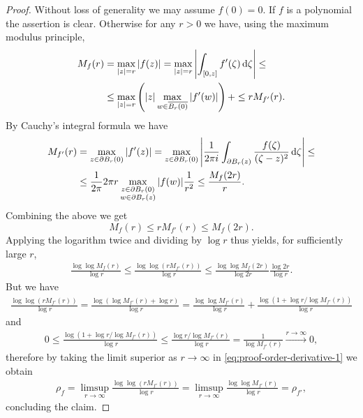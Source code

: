 \begin{proof}
    Without loss of generality we may assume $f(0) = 0$. If $f$ is a polynomial the assertion is clear. Otherwise for any $r > 0$ we have, using the maximum modulus principle,
    \begin{align*}
        M_f(r) &= \max_{\vert z \vert = r} \vert f(z) \vert = \max_{\vert z \vert = r} \left\vert \int_{[0, z]} f'(\zeta) \mathop{}\!\mathrm{d} \zeta \right\vert \leq \\
        &\leq \max_{\vert z \vert = r} \left( \vert z \vert \max_{w \in \overline{B_r(0)}} \vert f'(w) \vert \right) + \leq r M_{f'}(r).
    \end{align*}
    By Cauchy's integral formula we have
    \begin{align*}
        M_{f'}(r) &= \max_{z \in \partial B_r(0)} \vert f'(z) \vert = \max_{z \in \partial B_r(0)} \left\vert \frac{1}{2\pi i} \int_{\partial B_r(z)} \frac{f(\zeta)}{(\zeta-z)^2} \mathop{}\!\mathrm{d} \zeta \right\vert \leq \\
        &\leq \frac{1}{2 \pi} 2 \pi r \max_{\substack{z \in \partial B_r(0) \\ w \in \partial B_r(z)}} \vert f(w) \vert \frac{1}{r^2} \leq \frac{M_f(2r)}{r}.
    \end{align*}
    Combining the above we get
    \begin{equation*}
        M_f(r) \leq r M_{f'}(r) \leq M_f(2r).
    \end{equation*}
    Applying the logarithm twice and dividing by $\log r$ thus yields, for sufficiently large $r$,
    \begin{align*}
        \frac{\log \log M_f(r)}{\log r} \leq \frac{\log \log (r M_{f'}(r))}{\log r} \leq \frac{\log \log M_f (2r)}{\log 2r} \frac{\log 2r}{\log r}. \tag{\textasteriskcentered} \label{eq:proof-order-derivative-1}
    \end{align*}
    But we have
    \begin{align*}
        \frac{\log \log (r M_{f'}(r))}{\log r} = \frac{\log (\log M_{f'}(r) + \log r)}{\log r} = \frac{\log \log M_{f'}(r)}{\log r} + \frac{\log(1 + \log r / \log M_{f'}(r))}{\log r}
    \end{align*}
    and
    \begin{align*}
        0 \leq \frac{\log(1 + \log r / \log M_{f'}(r))}{\log r} \leq \frac{\log r / \log M_{f'}(r)}{\log r} = \frac{1}{\log M_{f'}(r)} \xrightarrow{r \to \infty} 0,
    \end{align*}
    therefore by taking the limit superior as $r \to \infty$ in \eqref{eq:proof-order-derivative-1} we obtain
    \begin{align*}
        \rho_f = \limsup_{r \to \infty} \frac{\log \log (r M_{f'}(r))}{\log r} = \limsup_{r \to \infty} \frac{\log \log M_{f'}(r)}{\log r} = \rho_{f'},
    \end{align*}
    concluding the claim.
\end{proof}

